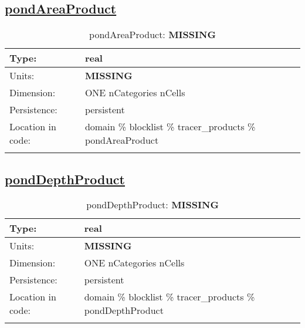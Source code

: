 \subsection[pondAreaProduct]{\hyperref[sec:var_tab_tracer_products]{pondAreaProduct}}
\label{subsec:var_sec_tracer_products_pondAreaProduct}
\begin{center}
\begin{longtable}{| p{2.0in} | p{4.0in} |}
        \hline 
        Type: & real \\
        \hline 
        Units: & {\bf \color{red} MISSING} \\
        \hline 
        Dimension: & ONE nCategories nCells \\
        \hline 
        Persistence: & persistent \\
        \hline 
         Location in code: & domain \% blocklist \% tracer\_products \% pondAreaProduct \\
         \hline 
    \caption{pondAreaProduct: {\bf \color{red} MISSING}}
\end{longtable}
\end{center}
\subsection[pondDepthProduct]{\hyperref[sec:var_tab_tracer_products]{pondDepthProduct}}
\label{subsec:var_sec_tracer_products_pondDepthProduct}
\begin{center}
\begin{longtable}{| p{2.0in} | p{4.0in} |}
        \hline 
        Type: & real \\
        \hline 
        Units: & {\bf \color{red} MISSING} \\
        \hline 
        Dimension: & ONE nCategories nCells \\
        \hline 
        Persistence: & persistent \\
        \hline 
         Location in code: & domain \% blocklist \% tracer\_products \% pondDepthProduct \\
         \hline 
    \caption{pondDepthProduct: {\bf \color{red} MISSING}}
\end{longtable}
\end{center}
